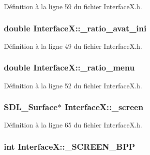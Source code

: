 Définition à la ligne 59 du fichier InterfaceX.h.

\hypertarget{a00011_a5b2280558d08c0c82dc1231af910617c}{
\subsubsection[{\_\-ratio\_\-avat\_\-ini}]{\setlength{\rightskip}{0pt plus 5cm}double {\bf InterfaceX::\_\-ratio\_\-avat\_\-ini}}}
\label{a00011_a5b2280558d08c0c82dc1231af910617c}


Définition à la ligne 49 du fichier InterfaceX.h.

\hypertarget{a00011_a49855d7045bc2dec7eee28540691d17b}{
\subsubsection[{\_\-ratio\_\-menu}]{\setlength{\rightskip}{0pt plus 5cm}double {\bf InterfaceX::\_\-ratio\_\-menu}}}
\label{a00011_a49855d7045bc2dec7eee28540691d17b}


Définition à la ligne 52 du fichier InterfaceX.h.

\hypertarget{a00011_a24f8420a0d24f9c943dc03ebf09a9b63}{
\subsubsection[{\_\-screen}]{\setlength{\rightskip}{0pt plus 5cm}SDL\_\-Surface$\ast$ {\bf InterfaceX::\_\-screen}}}
\label{a00011_a24f8420a0d24f9c943dc03ebf09a9b63}


Définition à la ligne 65 du fichier InterfaceX.h.

\hypertarget{a00011_a1b36ec980a5220505bbae259cc96bc2c}{
\subsubsection[{\_\-SCREEN\_\-BPP}]{\setlength{\rightskip}{0pt plus 5cm}int {\bf InterfaceX::\_\-SCREEN\_\-BPP}}}
\label{a00011_a1b36ec980a5220505bbae259cc96bc2c}



